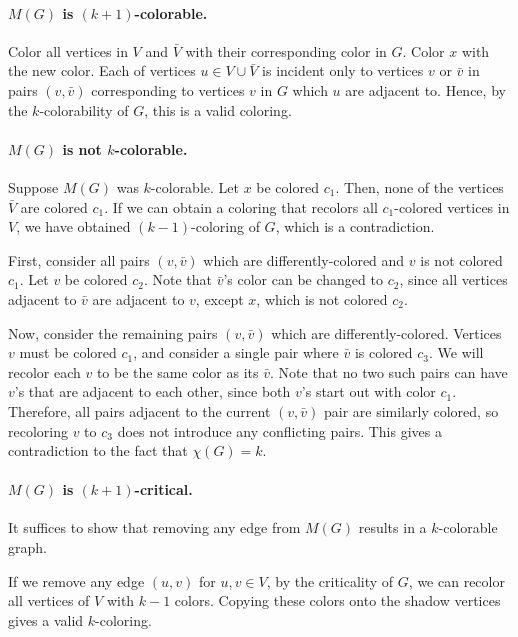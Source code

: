 \documentclass[11pt,letterpaper]{article}
\theoremstyle{definition}
\begin{document}
\paragraph{$M(G)$ is $(k+1)$-colorable.}
Color all vertices in $V$ and $\bar{V}$ with their corresponding color in $G$.
Color $x$ with the new color. 
Each of vertices $u\in V\cup \bar{V}$ is incident only to vertices $v$ or $\bar{v}$ in pairs $(v,\bar{v})$ corresponding to vertices $v$ in $G$ which $u$ are adjacent to.
Hence, by the $k$-colorability of $G$, this is a valid coloring.

\paragraph{$M(G)$ is not $k$-colorable.}

Suppose $M(G)$ was $k$-colorable. Let $x$ be colored $c_1$.
Then, none of the vertices $\bar{V}$ are colored $c_1$. 
If we can obtain a coloring that recolors all $c_1$-colored vertices in $V$, we have obtained $(k-1)$-coloring of $G$, which is a contradiction.

First, consider all pairs $(v,\bar{v})$ which are differently-colored and $v$ is not colored $c_1$. 
Let $v$ be colored $c_2$.
Note that $\bar{v}$'s color can be changed to $c_2$, since all vertices adjacent to $\bar{v}$ are adjacent to $v$, except $x$, which is not colored $c_2$.

Now, consider the remaining pairs $(v,\bar{v})$ which are differently-colored.
Vertices $v$ must be colored $c_1$, and consider a single pair where $\bar{v}$ is colored $c_3$.
We will recolor each $v$ to be the same color as its $\bar{v}$.
Note that no two such pairs can have $v$'s that are adjacent to each other, since both $v$'s start out with color $c_1$.
Therefore, all pairs adjacent to the current $(v,\bar{v})$ pair are similarly colored, so recoloring $v$ to $c_3$ does not introduce any conflicting pairs.
This gives a contradiction to the fact that $\chi(G) = k$.

\paragraph{$M(G)$ is $(k+1)$-critical.}

It suffices to show that removing any edge from $M(G)$ results in a $k$-colorable graph.

If we remove any edge $(u,v)$ for $u,v\in V$, by the criticality of $G$, we can recolor all vertices of $V$ with $k-1$ colors. 
Copying these colors onto the shadow vertices gives a valid $k$-coloring.
\end{document}

